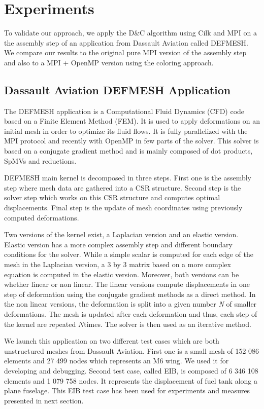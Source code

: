 \documentclass{IOS-Book-Article}
\begin{document}
\section{Experiments}
To validate our approach, we apply the D\&C algorithm using Cilk and MPI on a the assembly step of an application from Dassault Aviation called DEFMESH.
We compare our results to the original pure MPI version of the assembly step and also to a MPI + OpenMP version using the coloring approach.

\subsection{Dassault Aviation DEFMESH Application}
The DEFMESH application is a Computational Fluid Dynamics (CFD) code based on a Finite Element Method (FEM).
It is used to apply deformations on an initial mesh in order to optimize its fluid flows.
It is fully parallelized with the MPI protocol and recently with OpenMP in few parts of the solver.
This solver is based on a conjugate gradient method and is mainly composed of dot products, SpMVs and reductions.

DEFMESH main kernel is decomposed in three steps.
First one is the assembly step where mesh data are gathered into a CSR structure.
Second step is the solver step which works on this CSR structure and computes optimal displacements.
Final step is the update of mesh coordinates using previously computed deformations.

Two versions of the kernel exist, a Laplacian version and an elastic version. Elastic version has a more complex assembly step and different boundary conditions for the solver.
While a simple scalar is computed for each edge of the mesh in the Laplacian version, a 3 by 3 matrix based on a more complex equation is computed in the elastic version.
Moreover, both versions can be whether linear or non linear.
The linear versions compute displacements in one step of deformation using the conjugate gradient methods as a direct method.
In the non linear versions, the deformation is split into a given number \emph{N} of smaller deformations.
The mesh is updated after each deformation and thus, each step of the kernel are repeated $N$times. The solver is then used as an iterative method.

We launch this application on two different test cases which are both unstructured meshes from Dassault Aviation.
First one is a small mesh of 152 086 elements and 27 499 nodes which represents an M6 wing. We used it for developing and debugging.
Second test case, called EIB, is composed of 6 346 108 elements and 1 079 758 nodes. It represents the displacement of fuel tank along a plane fuselage.
This EIB test case has been used for experiments and measures presented in next section.
\end{document}
